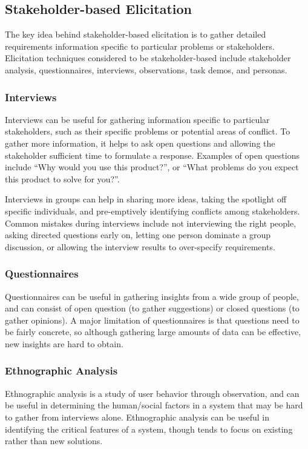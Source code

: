 \documentclass[12pt,titlepage]{article}
\begin{document}
    \subsection{Stakeholder-based Elicitation}
      The key idea behind stakeholder-based elicitation is to gather detailed requirements information specific to particular problems or stakeholders.
      Elicitation techniques considered to be stakeholder-based include stakeholder analysis, questionnaires, interviews, observations, task demos, and personas.

      \subsubsection{Interviews}
        Interviews can be useful for gathering information specific to particular stakeholders, such as their specific problems or potential areas of conflict.
        To gather more information, it helps to ask open questions and allowing the stakeholder sufficient time to formulate a response. Examples of open questions
        include ``Why would you use this product?'', or ``What problems do you expect this product to solve for you?''.

        Interviews in groups can help in sharing more ideas, taking the spotlight off specific individuals, and pre-emptively identifying conflicts among stakeholders.
        Common mistakes during interviews include not interviewing the right people, asking directed questions early on, letting one person dominate a group discussion,
        or allowing the interview results to over-specify requirements.

      \subsubsection{Questionnaires}
        Questionnaires can be useful in gathering insights from a wide group of people, and can consist of open question (to gather suggestions) or closed questions
        (to gather opinions). A major limitation of questionnaires is that questions need to be fairly concrete, so although gathering large amounts of data can be
        effective, new insights are hard to obtain.

      \subsubsection{Ethnographic Analysis}
        Ethnographic analysis is a study of user behavior through observation, and can be useful in determining the human/social factors in a system that
        may be hard to gather from interviews alone. Ethnographic analysis can be useful in identifying the critical features of a system, though tends to focus on
        existing rather than new solutions.
\end{document}
